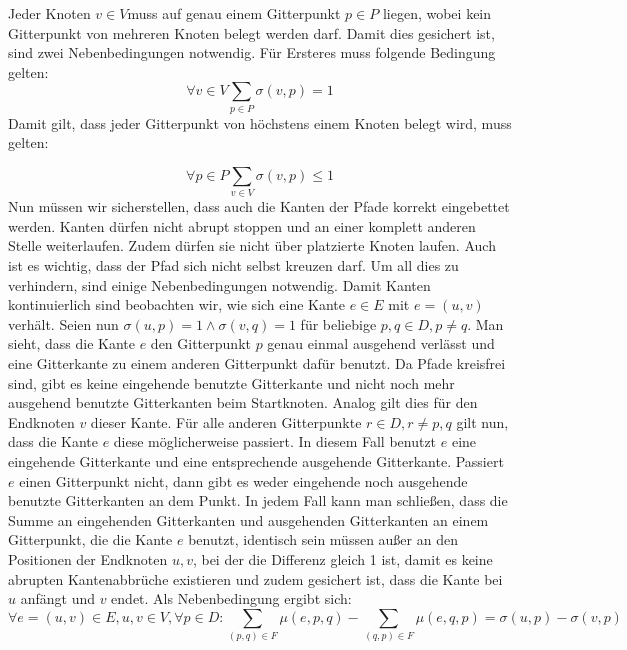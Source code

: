 \documentclass[bachelor, german]{algothesis}
\begin{document}
Jeder Knoten $v \in V$muss auf genau einem Gitterpunkt $p \in P$ liegen, wobei kein Gitterpunkt von mehreren Knoten belegt werden darf. Damit dies gesichert ist, sind zwei Nebenbedingungen notwendig. Für Ersteres muss folgende Bedingung gelten: 
     \begin{equation}
\forall v \in V \sum_{p \in P} \sigma(v,p) = 1
\tag{1}
\end{equation}
Damit gilt, dass jeder Gitterpunkt von höchstens einem Knoten belegt wird, muss gelten:

\begin{equation}
    \forall p \in P \sum_{v \in V} \sigma(v,p) \leq 1
    \tag{2}
\end{equation}
Nun müssen wir sicherstellen, dass auch die Kanten der Pfade korrekt eingebettet werden. Kanten dürfen nicht abrupt stoppen und an einer komplett anderen Stelle weiterlaufen. Zudem dürfen sie nicht über platzierte Knoten laufen. Auch ist es wichtig, dass der Pfad sich nicht selbst kreuzen darf. Um all dies zu verhindern, sind einige Nebenbedingungen notwendig. \newline
Damit Kanten kontinuierlich sind beobachten wir, wie sich eine Kante $e \in E$ mit $e = (u,v)$ verhält. Seien nun $\sigma(u,p) = 1 \land \sigma(v,q) = 1$ für beliebige $p,q \in D, p \neq q$. Man sieht, dass die Kante $e$ den Gitterpunkt $p$ genau einmal ausgehend verlässt und eine Gitterkante zu einem anderen Gitterpunkt dafür benutzt.  Da Pfade kreisfrei sind, gibt es keine eingehende benutzte Gitterkante und nicht noch mehr ausgehend benutzte Gitterkanten beim Startknoten. Analog gilt dies für den Endknoten $v$ dieser Kante. Für alle anderen Gitterpunkte $r \in D, r \neq p,q$ gilt nun, dass die Kante $e$ diese möglicherweise passiert. In diesem Fall benutzt $e$ eine eingehende Gitterkante und eine entsprechende ausgehende Gitterkante. Passiert $e$ einen Gitterpunkt nicht, dann gibt es weder eingehende noch ausgehende benutzte Gitterkanten an dem Punkt. In jedem Fall kann man schließen, dass die Summe an eingehenden Gitterkanten und ausgehenden Gitterkanten an einem Gitterpunkt, die die Kante $e$ benutzt, identisch sein müssen außer an den Positionen der Endknoten $u,v$, bei der die Differenz gleich 1 ist, damit es keine abrupten Kantenabbrüche existieren und zudem gesichert ist, dass die Kante bei $u$ anfängt und $v$ endet. Als Nebenbedingung ergibt sich: 
\begin{equation}
    \forall e=(u,v) \in E, u,v \in V, \forall p \in D: \sum_{(p,q) \in F} \mu(e,p,q) - \sum_{(q,p) \in F} \mu(e,q,p) = \sigma(u,p) - \sigma(v,p)
    \tag{3}
\end{equation}
\end{document}
